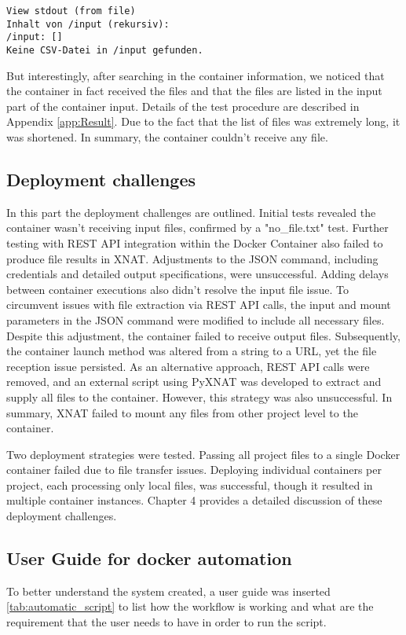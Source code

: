 \begin{lstlisting}[numbers=none, caption={stdout in XNAT.}, label={lst:stdout}]
View stdout (from file)
Inhalt von /input (rekursiv):
/input: []
Keine CSV-Datei in /input gefunden.
\end{lstlisting}


\normalsize
But interestingly, after searching in the container information, we noticed that the container in fact received the files and that the files are listed in the input part of the container input. 
Details of the test procedure are described in Appendix 
\autoref{app:Result}. Due to the fact that the list of files was extremely long, it was shortened. In summary, the container couldn't receive any file.
\normalsize
\subsection{Deployment challenges}
 In this part the deployment challenges are outlined. Initial tests revealed the container wasn't receiving input files, confirmed by a "no\_file.txt" test. Further testing with REST API integration within the Docker Container also failed to produce file results in XNAT. Adjustments to the JSON command, including credentials and detailed output specifications, were unsuccessful. Adding delays between container executions also didn't resolve the input file issue.
To circumvent issues with file extraction via REST API calls, the input and mount parameters in the JSON command were modified to include all necessary files. Despite this adjustment, the container failed to receive output files. Subsequently, the container launch method was altered from a string to a URL, yet the file reception issue persisted. As an alternative approach, REST API calls were removed, and an external script using PyXNAT was developed to extract and supply all files to the container. However, this strategy was also unsuccessful. In summary, XNAT failed to mount any files  from other project level to the container.

Two deployment strategies were tested. Passing all project files to a single Docker container failed due to file transfer issues. Deploying individual containers per project, each processing only local files, was successful, though it resulted in multiple container instances. Chapter 4 provides a detailed discussion of these deployment challenges. 


\normalsize



\subsection{User Guide for docker automation}
To better understand the system created, a user guide was inserted \autoref{tab:automatic_script} to list how the workflow is working and what are the requirement that the user needs to have in order to run the script. 

